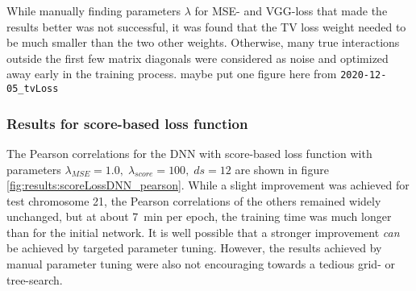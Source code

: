 While manually finding parameters $\lambda$ for MSE- and VGG-loss that made the results better was not successful,
it was found that the TV loss weight needed to be much smaller than the two other weights.
Otherwise, many true interactions outside the first few matrix diagonals were considered as noise and optimized away early in the training process.
\xxx maybe put one figure here from \texttt{2020-12-05\_tvLoss}

\subsubsection{Results for score-based loss function} \label{sec:results:scorebased}
The Pearson correlations for the DNN with score-based loss function with parameters $\lambda_\mathit{MSE}=1.0,\; \lambda_\mathit{score}=100,\; ds=12$ 
are shown in figure \ref{fig:results:scoreLossDNN_pearson}.
While a slight improvement was achieved for test chromosome 21, the Pearson correlations of the others remained widely unchanged,
but at about \SI{7}{min} per epoch, the training time was much longer than for the initial network.
It is well possible that a stronger improvement \emph{can} be achieved by targeted parameter tuning. 
However, the results achieved by manual parameter tuning were also not encouraging towards a tedious grid- or tree-search.
